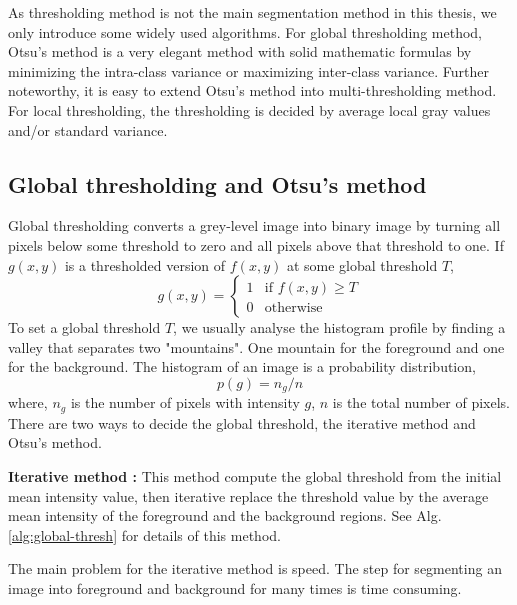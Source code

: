 As thresholding method is not the main segmentation method in this thesis, we only introduce some widely used algorithms. For global thresholding method, Otsu's method \cite{otsu1975threshold} is a very elegant method with solid mathematic formulas by minimizing the intra-class variance or maximizing inter-class variance. Further noteworthy, it is easy to extend Otsu's method into multi-thresholding method. For local thresholding, the thresholding is decided by average local gray values and/or standard variance. 
\subsection{Global thresholding and Otsu's method}
Global thresholding converts a grey-level image into binary image by turning all pixels below some threshold to zero and all pixels above that threshold to one. If $g(x,y)$ is a thresholded version of $f(x,y)$ at some global threshold $T$, 
\begin{equation}
g(x,y) = \left\{
  \begin{array}{ll}
  1 & \mbox{if } f(x,y) \ge T \\
  0 & \mbox{otherwise}
  \end{array}
  \right.
\end{equation}
To set a global threshold $T$, we usually analyse the histogram profile by finding a valley that separates two "mountains". One mountain for the foreground and one for the background. The histogram of an image is a probability distribution,
\begin{equation}
p(g) = n_g/n
\end{equation}
where, $n_g$ is the number of pixels with intensity $g$, $n$ is the total number of pixels. There are two ways to decide the global threshold, the iterative method and Otsu's method. 

\textbf{Iterative method :} This method compute the global threshold from the initial mean intensity value, then iterative replace the threshold value by the average mean intensity of the foreground and the background regions. See Alg. \ref{alg:global-thresh} for details of this method.

The main problem for the iterative method is speed. The step for segmenting an image into foreground and background for many times is time consuming.

